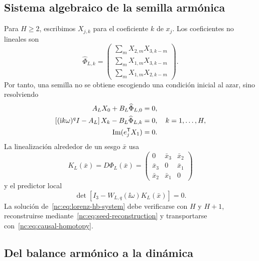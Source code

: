\subsection{Sistema algebraico de la semilla armónica}

Para \(H\geq2\), escribimos \(X_{j,k}\) para el coeficiente \(k\) de \(x_j\).
Los coeficientes no lineales son
\begin{equation}
 \widehat\Phi_{L,k}=
 \begin{pmatrix}
 \displaystyle\sum_m X_{2,m}X_{3,k-m}\\[5pt]
 \displaystyle\sum_m X_{1,m}X_{3,k-m}\\[5pt]
 \displaystyle\sum_m X_{1,m}X_{2,k-m}
 \end{pmatrix}.
 \label{nc:eq:lorenz-fourier-phi}
\end{equation}
Por tanto, una semilla no se obtiene escogiendo una condición inicial al azar,
sino resolviendo
\begin{align}
 A_LX_0+B_L\widehat\Phi_{L,0}&=0,\\
 \left[(\mathrm{i} k\omega)^qI-A_L\right]X_k
 -B_L\widehat\Phi_{L,k}&=0,
 \quad k=1,\ldots,H,\\
 \operatorname{Im}(e_j^{\mathsf T} X_1)&=0.
 \label{nc:eq:lorenz-hb-system}
\end{align}
La linealización alrededor de un sesgo \(\bar x\) usa
\begin{equation}
 K_L(\bar x)=D\Phi_L(\bar x)=
 \begin{pmatrix}
 0&\bar x_3&\bar x_2\\
 \bar x_3&0&\bar x_1\\
 \bar x_2&\bar x_1&0
 \end{pmatrix}
 \label{nc:eq:lorenz-k}
\end{equation}
y el predictor local
\begin{equation}
 \det\left[I_3-W_{L,q}(\ii\omega)K_L(\bar x)\right]=0.
 \label{nc:eq:lorenz-local-closure}
\end{equation}
La solución de~\eqref{nc:eq:lorenz-hb-system} debe verificarse con \(H\) y
\(H+1\), reconstruirse mediante~\eqref{nc:eq:seed-reconstruction} y transportarse
con~\eqref{nc:eq:causal-homotopy}.

\subsection{Del balance armónico a la dinámica}

